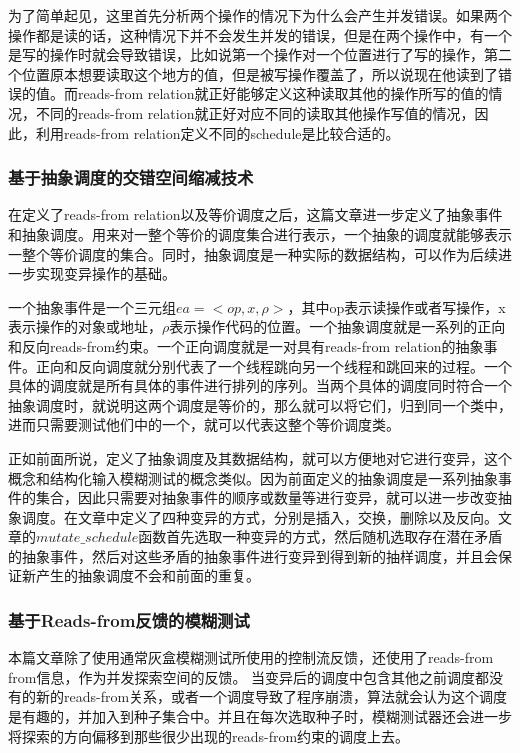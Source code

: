 为了简单起见，这里首先分析两个操作的情况下为什么会产生并发错误。如果两个操作都是读的话，这种情况下并不会发生并发的错误，但是在两个操作中，有一个是写的操作时就会导致错误，比如说第一个操作对一个位置进行了写的操作，第二个位置原本想要读取这个地方的值，但是被写操作覆盖了，所以说现在他读到了错误的值。而reads-from relation就正好能够定义这种读取其他的操作所写的值的情况，不同的reads-from relation就正好对应不同的读取其他操作写值的情况，因此，利用reads-from relation定义不同的schedule是比较合适的。

\subsubsection{基于抽象调度的交错空间缩减技术}

在定义了reads-from relation以及等价调度之后，这篇文章进一步定义了抽象事件和抽象调度。用来对一整个等价的调度集合进行表示，一个抽象的调度就能够表示一整个等价调度的集合。同时，抽象调度是一种实际的数据结构，可以作为后续进一步实现变异操作的基础。

一个抽象事件是一个三元组$ea=<op, x, \rho>$，其中op表示读操作或者写操作，x表示操作的对象或地址，$\rho$表示操作代码的位置。一个抽象调度就是一系列的正向和反向reads-from约束。一个正向调度就是一对具有reads-from relation的抽象事件。正向和反向调度就分别代表了一个线程跳向另一个线程和跳回来的过程。一个具体的调度就是所有具体的事件进行排列的序列。当两个具体的调度同时符合一个抽象调度时，就说明这两个调度是等价的，那么就可以将它们，归到同一个类中，进而只需要测试他们中的一个，就可以代表这整个等价调度类。

正如前面所说，定义了抽象调度及其数据结构，就可以方便地对它进行变异，这个概念和结构化输入模糊测试的概念类似\cite{blazytko2019grimoire, godefroid2020intelligent, pham2019smart}。因为前面定义的抽象调度是一系列抽象事件的集合，因此只需要对抽象事件的顺序或数量等进行变异，就可以进一步改变抽象调度。在文章中定义了四种变异的方式，分别是插入，交换，删除以及反向。文章的$mutate\_schedule$函数首先选取一种变异的方式，然后随机选取存在潜在矛盾的抽象事件，然后对这些矛盾的抽象事件进行变异到得到新的抽样调度，并且会保证新产生的抽象调度不会和前面的重复。

\subsubsection{基于Reads-from反馈的模糊测试}

本篇文章除了使用通常灰盒模糊测试所使用的控制流反馈，还使用了reads-from from信息，作为并发探索空间的反馈。 当变异后的调度中包含其他之前调度都没有的新的reads-from关系，或者一个调度导致了程序崩溃，算法就会认为这个调度是有趣的，并加入到种子集合中。并且在每次选取种子时，模糊测试器还会进一步将探索的方向偏移到那些很少出现的reads-from约束的调度上去。

